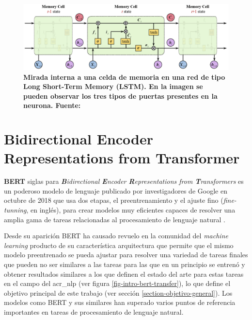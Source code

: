 \begin{figure}[ht!]
    \centering
    \includegraphics[scale=0.4]{figuras/intro-arq-lstm.png}
    \caption[Arquitectura de red Long Short-Term Memory (LSTM)]{\textbf{Mirada interna a una celda de memoria en una red de tipo Long Short-Term Memory (LSTM). En la imagen se pueden observar los tres tipos de puertas presentes en la neurona. Fuente: \citep{LSTM_Olah_2015}}}
    \label{fig-intro-arq-lstm}
\end{figure}

\section{Bidirectional Encoder Representations from Transformer}
\label{section-bert}

\textbf{BERT} siglas para \textit{\textbf{B}idirectional \textbf{E}ncoder \textbf{R}epresentations from \textbf{T}ransformers} es un poderoso modelo de lenguaje publicado por investigadores de Google en octubre de 2018 que usa dos etapas, el preentrenamiento y el ajuste fino (\textit{fine-tunning}, en inglés), para crear modelos muy eficientes capaces de resolver  una amplia gama de tareas relacionadas al procesamiento de lenguaje natural \citep{https://doi.org/10.48550/arxiv.1810.04805}.

Desde su aparición BERT ha causado revuelo en la comunidad del \textit{machine learning} producto de su característica arquitectura que permite que el mismo modelo preentrenado se pueda ajustar para resolver una variedad de tareas finales que pueden no ser similares a las tareas para las que en un principio se entrenó y obtener resultados similares a los que definen el estado del arte para estas tareas en el campo del \acrshort{acr_nlp} (ver figura \ref{fig-intro-bert-transfer}), lo que define el objetivo principal de este trabajo (ver sección \ref{section-objetivo-general}). Los modelos como BERT y sus similares han superado varios puntos de referencia importantes en tareas de procesamiento de lenguaje natural. 

